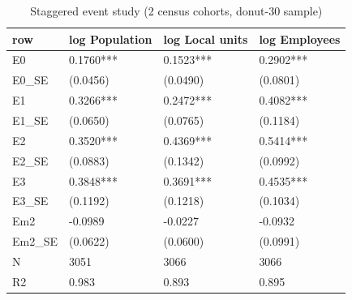 \begin{table}

\caption{Staggered event study (2 census cohorts, donut-30 sample)}
\centering
\begin{tabular}[t]{llll}
\toprule
row & log Population & log Local units & log Employees\\
\midrule
E0 & 0.1760*** & 0.1523*** & 0.2902***\\
E0\_SE & (0.0456) & (0.0490) & (0.0801)\\
E1 & 0.3266*** & 0.2472*** & 0.4082***\\
E1\_SE & (0.0650) & (0.0765) & (0.1184)\\
E2 & 0.3520*** & 0.4369*** & 0.5414***\\
\addlinespace
E2\_SE & (0.0883) & (0.1342) & (0.0992)\\
E3 & 0.3848*** & 0.3691*** & 0.4535***\\
E3\_SE & (0.1192) & (0.1218) & (0.1034)\\
Em2 & -0.0989 & -0.0227 & -0.0932\\
Em2\_SE & (0.0622) & (0.0600) & (0.0991)\\
\addlinespace
N & 3051 & 3066 & 3066\\
R2 & 0.983 & 0.893 & 0.895\\
\bottomrule
\end{tabular}
\end{table}
